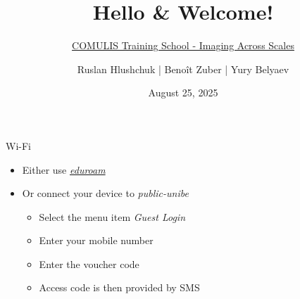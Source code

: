 \documentclass[aspectratio=169,12pt]{beamer}
\title{Hello \& Welcome!}
\subtitle{\href{https://www.ana.unibe.ch/weiterbildung/comulis_training_school/}{COMULIS Training School - Imaging Across Scales}}
\author{Ruslan Hlushchuk | Benoît Zuber | Yury Belyaev}
\institute{Institute of Anatomy}
\date{August 25, 2025}
\begin{document}
\begin{frame}
	\titlepage
\end{frame}

\begin{frame}{Wi-Fi}
	\begin{itemize}
		\item Either use \emph{\href{https://www.eduroam.org/}{eduroam}}
		\item Or connect your device to \emph{public-unibe}
		\begin{itemize}
			\item Select the menu item \emph{Guest Login}
			\item Enter your mobile number
			\item Enter the voucher code \alert{}
			\item Access code is then provided by SMS
		\end{itemize}
	\end{itemize}
\end{frame}
\end{document}
